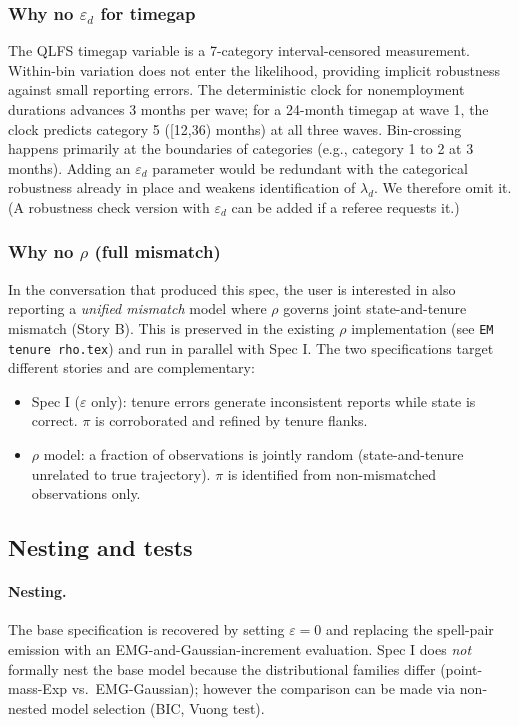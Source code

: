 \subsubsection{Why no \(\varepsilon_d\) for timegap}

The QLFS timegap variable is a 7-category interval-censored measurement.
Within-bin variation does not enter the likelihood, providing implicit
robustness against small reporting errors. The deterministic clock for
nonemployment durations advances 3 months per wave; for a 24-month timegap
at wave 1, the clock predicts category 5 ([12,36) months) at all three
waves. Bin-crossing happens primarily at the boundaries of categories
(e.g., category 1 to 2 at 3 months). Adding an \(\varepsilon_d\) parameter
would be redundant with the categorical robustness already in place and
weakens identification of \(\lambda_d\). We therefore omit it. (A robustness
check version with \(\varepsilon_d\) can be added if a referee requests it.)

\subsubsection{Why no \(\rho\) (full mismatch)}

In the conversation that produced this spec, the user is interested in
also reporting a \emph{unified mismatch} model where \(\rho\) governs joint
state-and-tenure mismatch (Story B). This is preserved in the existing
\(\rho\) implementation (see \texttt{EM tenure rho.tex}) and run in parallel
with Spec I. The two specifications target different stories and are
complementary:

\begin{itemize}
\item Spec I (\(\varepsilon\) only): tenure errors generate inconsistent
  reports while state is correct. \(\pi\) is corroborated and refined by
  tenure flanks.
\item \(\rho\) model: a fraction of observations is jointly random
  (state-and-tenure unrelated to true trajectory). \(\pi\) is identified
  from non-mismatched observations only.
\end{itemize}

\subsection{Nesting and tests}

\paragraph{Nesting.} The base specification is recovered by setting
\(\varepsilon = 0\) and replacing the spell-pair emission with an
EMG-and-Gaussian-increment evaluation. Spec I does \emph{not} formally
nest the base model because the distributional families differ
(point-mass-Exp vs.\ EMG-Gaussian); however the comparison can be made via
non-nested model selection (BIC, Vuong test).

